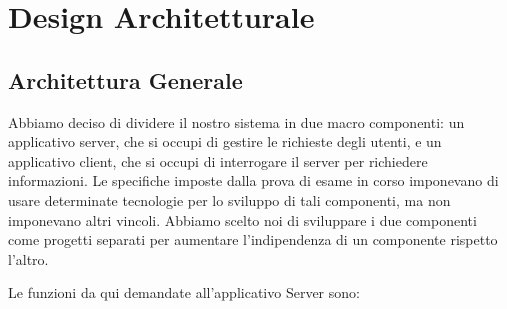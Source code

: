 

\chapter{Design Architetturale}

    \section{Architettura Generale}
    
    Abbiamo deciso di dividere il nostro sistema in due macro componenti: un applicativo server, che si occupi di gestire le richieste degli utenti, e un applicativo client, che si occupi di interrogare il server per richiedere informazioni. Le specifiche imposte dalla prova di esame in corso imponevano di usare determinate tecnologie per lo sviluppo di tali componenti, ma non imponevano altri vincoli. Abbiamo scelto noi di sviluppare i due componenti come progetti separati per aumentare l'indipendenza di un componente rispetto l'altro.
    
    \par Le funzioni da qui demandate all'applicativo Server sono:
    
